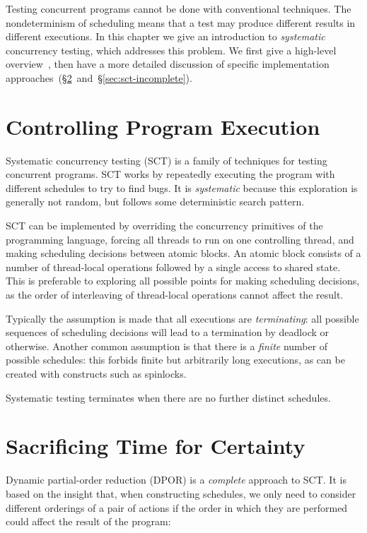 \chapstart Testing concurrent programs cannot be done with conventional
techniques.  The nondeterminism of scheduling means that a test may produce
different results in different executions.  In this chapter we give an
introduction to \emph{systematic} concurrency testing, which addresses this
problem.  We first give a high-level overview~, then have
a more detailed discussion of specific implementation
approaches~(\S\ref{sec:sct-complete}~and~\S\ref{sec:sct-incomplete}).

\section{Controlling Program Execution}
\label{sec:sct-fundamentals}

Systematic concurrency testing
(SCT)\cite{coons2013,musuvathi2008,musuvathi2007,flanagan2005} is a family of
techniques for testing concurrent programs.  SCT works by repeatedly executing
the program with different schedules to try to find bugs.  It is
\emph{systematic} because this exploration is generally not random, but follows
some deterministic search pattern.

SCT can be implemented by overriding the concurrency primitives of the
programming language, forcing all threads to run on one controlling thread, and
making scheduling decisions between atomic blocks.  An atomic block consists of
a number of thread-local operations followed by a single access to shared state.
This is preferable to exploring all possible points for making scheduling
decisions, as the order of interleaving of thread-local operations cannot affect
the result.

Typically the assumption is made that all executions are \emph{terminating}: all
possible sequences of scheduling decisions will lead to a termination by
deadlock or otherwise.  Another common assumption is that there is a
\emph{finite} number of possible schedules: this forbids finite but arbitrarily
long executions, as can be created with constructs such as spinlocks.

Systematic testing terminates when there are no further distinct schedules.

\section{Sacrificing Time for Certainty}
\label{sec:sct-complete}

Dynamic partial-order reduction (DPOR)\cite{flanagan2005,godefroid1996} is a
\emph{complete} approach to SCT\@.  It is based on the insight that, when
constructing schedules, we only need to consider different orderings of a pair
of actions if the order in which they are performed could affect the result of
the program:

